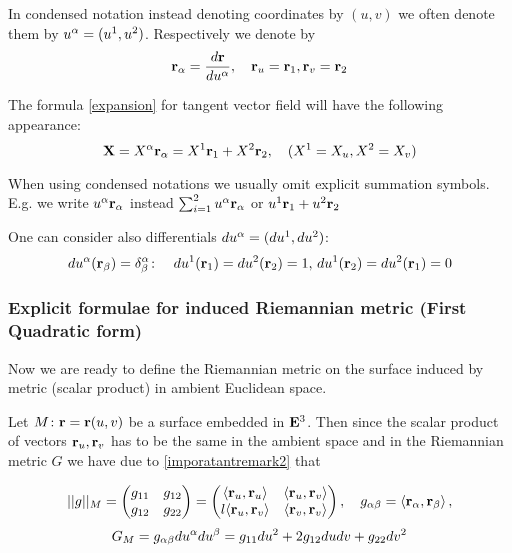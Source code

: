 \documentclass[12pt]{article}
\theoremstyle{theorem}
\numberwithin{equation}{section}
\begin{document}
\m

 In condensed notation instead denoting
 coordinates by $(u,v)$
we often denote them by
$u^\alpha=(u^1,u^2)$. Respectively we denote by
     $$
     {\bf r}_\alpha={d{\bf r}\over du^\alpha},\quad  {\bf r}_u={\bf r}_1, {\bf r}_v={\bf r}_2
     $$



 The formula \eqref{expansion} for
tangent vector field will have the following appearance:
\begin{equation}\label{expansioncondensed}
  {\bf X}=X^\alpha{\bf r}_\alpha=X^1{\bf r}_1+X^2{\bf r}_2,\quad (X^1=X_u, X^2=X_v)
\end{equation}



\medskip


When using condensed notations we usually omit explicit summation symbols.
E.g. we write $u^\alpha{\bf r}_\alpha$ instead $\sum_{i=1}^2 u^\alpha{\bf r}_\alpha$ or $u^1{\bf r}_1+u^2{\bf r}_2$

One can consider also differentials $du^\alpha=(du^1,du^2)$:
\begin{equation}\label{difonvector}
  du^\alpha({\bf r}_\beta)=\delta^\alpha_\beta\colon\quad
  du^1({\bf r}_1)=du^2({\bf r}_2)=1,\,du^1({\bf r}_2)=du^2({\bf r}_1)=0
\end{equation}




  \subsubsection {Explicit formulae for induced Riemannian metric (First Quadratic form)}

Now we are ready to define the Riemannian metric on the surface induced by metric (scalar product)
in ambient Euclidean space.

     Let $M\colon {\bf r}={\bf r}(u,v)$ be a surface embedded in ${\bf E}^3$.  Then
     since the scalar product of vectors ${\bf r}_u,{\bf r}_v$ has to be the same in the ambient space
     and in the Riemannian metric $G$ we have due to  \eqref{imporatantremark2} that

\begin{equation*}
||g||_M=
\begin{pmatrix}
   g_{11} & g_{12} \\
   g_{12}& g_{22} \\
   \end{pmatrix}=
   \begin{pmatrix}
   \langle{\bf r}_u,{\bf r}_u\rangle & \langle{\bf r}_u,{\bf r}_v\rangle \\l
   \langle{\bf r}_u,{\bf r}_v\rangle & \langle{\bf r}_v,{\bf r}_v\rangle \\
   \end{pmatrix},\quad g_{\alpha\beta}=\langle{\bf r}_\alpha,{\bf r}_\beta\rangle\,,
\end{equation*}
             \begin{equation}\label{firstquadraticform}
          G_M=g_{\alpha\beta}du^\alpha du^\beta=g_{11}du^2+2g_{12}dudv+g_{22}dv^2
             \end{equation}
\end{document}
